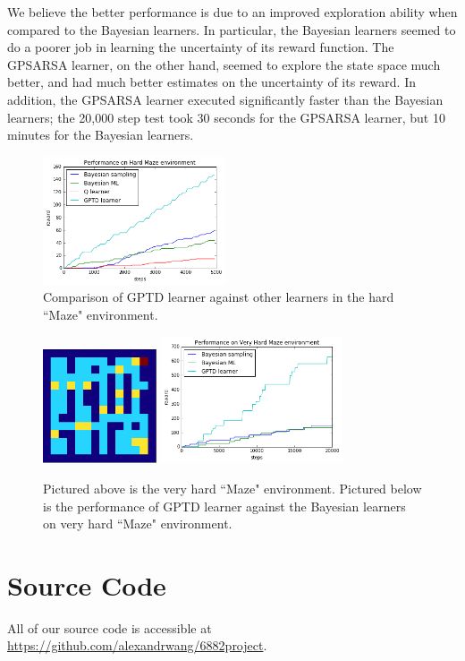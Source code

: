 \documentclass[10pt, twocolumn, twoside]{article}
\begin{document}
We believe the better performance is due to an improved exploration ability when compared to the Bayesian learners. In particular, the Bayesian learners seemed to do a poorer job in learning the uncertainty of its reward function. The GPSARSA learner, on the other hand, seemed to explore the state space much better, and had much better estimates on the uncertainty of its reward. In addition, the GPSARSA learner executed significantly faster than the Bayesian learners; the 20,000 step test took 30 seconds for the GPSARSA learner, but 10 minutes for the Bayesian learners.

\begin{figure}[!htb]
\centering
\includegraphics[width=0.48\textwidth]{gptdCompare}
\caption{\label{fig:gptdCompare} Comparison of GPTD learner against other learners in the hard ``Maze" environment.}
\end{figure}
\begin{figure}[!htb]
\centering
\includegraphics[width=0.30\textwidth]{veryhardmaze}
\includegraphics[width=0.48\textwidth]{veryHardMazePerf}
\caption{\label{fig:veryHard} Pictured above is the very hard ``Maze" environment. Pictured below is the performance of GPTD learner against the Bayesian learners on very hard ``Maze" environment.}
\end{figure}

\section{Source Code}
All of our source code is accessible at \url{https://github.com/alexandrwang/6882project}.



\end{document}

